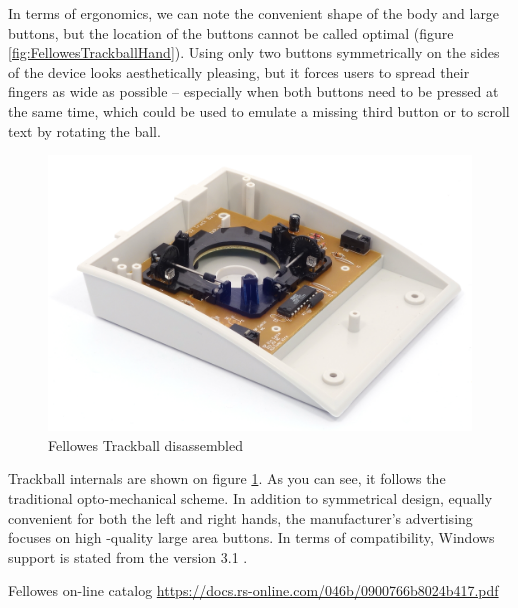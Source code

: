 \documentclass[11pt, a4paper]{article}
\begin{document}
In terms of ergonomics, we can note the convenient shape of the body and large buttons, but the location of the buttons cannot be called optimal (figure \ref{fig:FellowesTrackballHand}). Using only two buttons symmetrically on the sides of the device looks aesthetically pleasing, but it forces users to spread their fingers as wide as possible -- especially when both buttons need to be pressed at the same time, which could be used to emulate a missing third button or to scroll text by rotating the ball.

\begin{figure}[h]
    \centering
    \includegraphics[scale=0.7]{1995_fellowes_trackball/inside_60.jpg}
    \caption{Fellowes Trackball disassembled}
    \label{fig:FellowesTrackballInside}
\end{figure}

Trackball internals are shown on figure \ref{fig:FellowesTrackballInside}. As you can see, it follows the traditional opto-mechanical scheme. In addition to symmetrical design, equally convenient for both the left and right hands, the manufacturer’s advertising focuses on high -quality large area buttons. In terms of compatibility, Windows support is stated from the version 3.1 \cite{advertising}.

\begin{thebibliography}{9}
 Fellowes on-line catalog \url{https://docs.rs-online.com/046b/0900766b8024b417.pdf}
\end{thebibliography}
\end{document}
